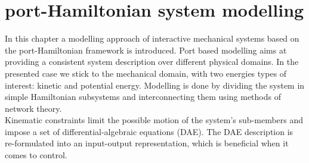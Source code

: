 \documentclass[a4paper,twoside, openright,12pt]{report}
\begin{document}
\chapter{port-Hamiltonian system modelling}
In this chapter a modelling approach of interactive mechanical systems based on the port-Hamiltonian framework is introduced. Port based modelling aims at providing a consistent system description over different physical domains. In the presented case we stick to the mechanical domain, with two energies types of interest: kinetic and potential energy. 
Modelling is done by dividing the system in simple Hamiltonian subsystems and interconnecting them using methods of network theory.\\
Kinematic constraints limit the possible motion of the system's sub-members and impose a set of differential-algebraic equations (DAE). The DAE description is re-formulated into an input-output representation, which is beneficial when it comes to control.   
\end{document}
